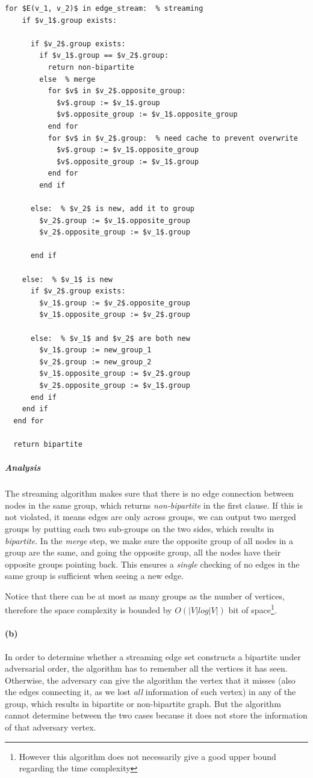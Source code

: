 \documentclass[12pt]{article}
\begin{document}
\begin{lstlisting}[style=customc]
  for $E(v_1, v_2)$ in edge_stream:  % streaming
    if $v_1$.group exists:
      
      if $v_2$.group exists:
        if $v_1$.group == $v_2$.group:
          return non-bipartite
        else  % merge
          for $v$ in $v_2$.opposite_group:
            $v$.group := $v_1$.group
            $v$.opposite_group := $v_1$.opposite_group
          end for
          for $v$ in $v_2$.group:  % need cache to prevent overwrite
            $v$.group := $v_1$.opposite_group
            $v$.opposite_group := $v_1$.group
          end for
        end if
      
      else:  % $v_2$ is new, add it to group
        $v_2$.group := $v_1$.opposite_group
        $v_2$.opposite_group := $v_1$.group
      
      end if 
    
    else:  % $v_1$ is new
      if $v_2$.group exists:
        $v_1$.group := $v_2$.opposite_group 
        $v_1$.opposite_group := $v_2$.group
        
      else:  % $v_1$ and $v_2$ are both new
        $v_1$.group := new_group_1
        $v_2$.group := new_group_2
        $v_1$.opposite_group := $v_2$.group
        $v_2$.opposite_group := $v_1$.group
      end if
    end if
  end for
  
  return bipartite
\end{lstlisting}

\subparagraph{Analysis} The streaming algorithm makes sure that there is no edge connection between nodes in the same group, which returns \emph{non-bipartite} in the first clause. If this is not violated, it means edges are only across groups, we can output two merged groups by putting each two sub-groups on the two sides, which results in \emph{bipartite}. In the \emph{merge} step, we make sure the opposite group of all nodes in a group are the same, and going the opposite group, all the nodes have their opposite groups pointing back. This ensures a \emph{single} checking of no edges in the same group is sufficient when seeing a new edge. 

Notice that there can be at most as many groups as the number of vertices, therefore the space complexity is bounded by $O(|V|log|V|)$ bit of space\footnote{However this algorithm does not necessarily give a good upper bound regarding the time complexity}. 

\paragraph{(b)} In order to determine whether a streaming edge set constructs a bipartite under adversarial order, the algorithm has to remember all the vertices  it has seen. Otherwise, the adversary can give the algorithm the vertex that it misses (also the edges connecting it, as we lost \emph{all} information of such vertex) in any of the group, which results in bipartite or non-bipartite graph. But the algorithm cannot determine between the two cases because it does not store the information of that adversary vertex. 
\end{document}

